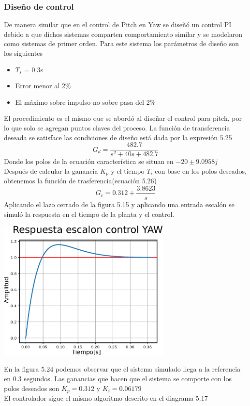 \subsubsection{Diseño de control}
De manera similar que en el control de Pitch en Yaw se diseñó un control PI debido a que dichos sistemas comparten comportamiento similar y se modelaron como sistemas de primer orden.
Para este sistema los parámetros de diseño son los siguientes
\begin{itemize}
	\item $T_s$ = 0.3s
	\item Error menor al 2\%
	\item El máximo sobre impulso no sobre pasa del 2\%
\end{itemize}
El procedimiento es el mismo que se abordó al diseñar el control para pitch, por lo que solo se agregan puntos claves del proceso.
La función de transferencia deseada se satisface las condiciones de diseño está dada por la expresión 5.25
\begin{equation}
	G_d = \frac{482.7}{s^2 + 40s + 482.7}
\end{equation}
Donde los polos de la ecuación característica se situan en $-20 \pm 9.0958j$\\
Después de calcular la ganancia $K_p$ y el tiempo $T_i$ con base en los polos deseados, obtenemos la función de trasferencia(ecuación 5.26)
\begin{equation}
	G_c = 0.312 + \frac{3.8623}{s}
\end{equation}
Aplicando el lazo cerrado de la figura 5.15 y aplicando una entrada escalón se simuló la respuesta en el tiempo de la planta y el control.
\begin{center}
	\includegraphics[width=0.65\textwidth]{Contenido/Cuerpo/Capitulo5/Fig40.eps}
	\label{Fig4}
\end{center}
En la figura 5.24 podemos observar que el sistema simulado llega a la referencia en 0.3 segundos. Las ganancias que hacen que el sistema se comporte con los polos deseados son
$K_p = 0.312$ y $K_i = 0.06179$\\
El controlador sigue el mismo algoritmo descrito en el diagrama 5.17
